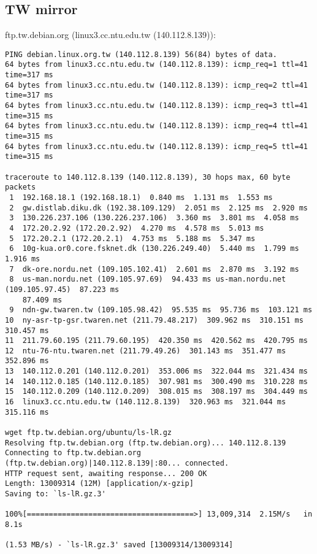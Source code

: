 \documentclass{acm_proc_article-sp}
\begin{document}
\subsection{TW mirror}\label{4}
ftp.tw.debian.org (linux3.cc.ntu.edu.tw (140.112.8.139)):
\begin{verbatim}
PING debian.linux.org.tw (140.112.8.139) 56(84) bytes of data.
64 bytes from linux3.cc.ntu.edu.tw (140.112.8.139): icmp_req=1 ttl=41 time=317 ms
64 bytes from linux3.cc.ntu.edu.tw (140.112.8.139): icmp_req=2 ttl=41 time=317 ms
64 bytes from linux3.cc.ntu.edu.tw (140.112.8.139): icmp_req=3 ttl=41 time=315 ms
64 bytes from linux3.cc.ntu.edu.tw (140.112.8.139): icmp_req=4 ttl=41 time=315 ms
64 bytes from linux3.cc.ntu.edu.tw (140.112.8.139): icmp_req=5 ttl=41 time=315 ms

traceroute to 140.112.8.139 (140.112.8.139), 30 hops max, 60 byte packets
 1  192.168.18.1 (192.168.18.1)  0.840 ms  1.131 ms  1.553 ms
 2  gw.distlab.diku.dk (192.38.109.129)  2.051 ms  2.125 ms  2.920 ms
 3  130.226.237.106 (130.226.237.106)  3.360 ms  3.801 ms  4.058 ms
 4  172.20.2.92 (172.20.2.92)  4.270 ms  4.578 ms  5.013 ms
 5  172.20.2.1 (172.20.2.1)  4.753 ms  5.188 ms  5.347 ms
 6  10g-kua.or0.core.fsknet.dk (130.226.249.40)  5.440 ms  1.799 ms  1.916 ms
 7  dk-ore.nordu.net (109.105.102.41)  2.601 ms  2.870 ms  3.192 ms
 8  us-man.nordu.net (109.105.97.69)  94.433 ms us-man.nordu.net (109.105.97.45)  87.223 ms   
    87.409 ms
 9  ndn-gw.twaren.tw (109.105.98.42)  95.535 ms  95.736 ms  103.121 ms
10  ny-asr-tp-gsr.twaren.net (211.79.48.217)  309.962 ms  310.151 ms  310.457 ms
11  211.79.60.195 (211.79.60.195)  420.350 ms  420.562 ms  420.795 ms
12  ntu-76-ntu.twaren.net (211.79.49.26)  301.143 ms  351.477 ms  352.896 ms
13  140.112.0.201 (140.112.0.201)  353.006 ms  322.044 ms  321.434 ms
14  140.112.0.185 (140.112.0.185)  307.981 ms  300.490 ms  310.228 ms
15  140.112.0.209 (140.112.0.209)  308.015 ms  308.197 ms  304.449 ms
16  linux3.cc.ntu.edu.tw (140.112.8.139)  320.963 ms  321.044 ms  315.116 ms

wget ftp.tw.debian.org/ubuntu/ls-lR.gz
Resolving ftp.tw.debian.org (ftp.tw.debian.org)... 140.112.8.139
Connecting to ftp.tw.debian.org (ftp.tw.debian.org)|140.112.8.139|:80... connected.
HTTP request sent, awaiting response... 200 OK
Length: 13009314 (12M) [application/x-gzip]
Saving to: `ls-lR.gz.3'

100%[======================================>] 13,009,314  2.15M/s   in 8.1s    

(1.53 MB/s) - `ls-lR.gz.3' saved [13009314/13009314]
\end{verbatim}
\end{document}
